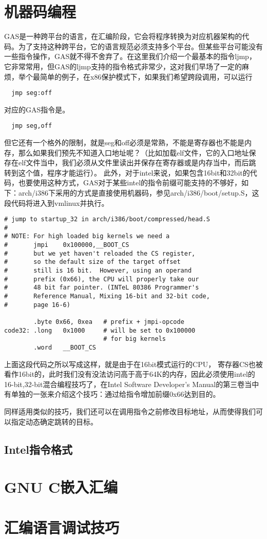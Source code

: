\section{机器码编程}
GAS是一种跨平台的语言，在汇编阶段，它会将程序转换为对应机器架构的代码。为了支持这种跨平台，它的语言规范必须支持多个平台。但某些平台可能没有一些指令操作，GAS就不得不舍弃了。在这里我们介绍一个最基本的指令ljmp，它非常常用，但GAS的ljmp支持的指令格式非常少，这对我们早场了一定的麻烦，举个最简单的例子，在x86保护模式下，如果我们希望跨段调用，可以运行
\begin{lstlisting}
  jmp seg:off
\end{lstlisting}
对应的GAS指令是。
\begin{lstlisting}
  jmp seg,off
\end{lstlisting}
但它还有一个格外的限制，就是seg和off必须是常熟，不能是寄存器也不能是内存，那么如果我们预先不知道入口地址呢？（比如加载elf文件，它的入口地址保存在elf文件当中，我们必须从文件里读出并保存在寄存器或是内存当中，而后跳转到这个值，程序才能运行）。
此外，对于intel来说，如果包含16bit和32bit的代码，也要使用这种方式，GAS对于某些intel的指令前缀可能支持的不够好，如下：arch/i386下采用的方式是直接使用机器码，参见arch/i386/boot/setup.S，这段代码将进入到vmlinux并执行。
\begin{lstlisting}
# jump to startup_32 in arch/i386/boot/compressed/head.S
#
# NOTE: For high loaded big kernels we need a
#       jmpi    0x100000,__BOOT_CS
#       but we yet haven't reloaded the CS register,
#       so the default size of the target offset
#       still is 16 bit.  However, using an operand 
#       prefix (0x66), the CPU will properly take our 
#       48 bit far pointer. (INTeL 80386 Programmer's 
#       Reference Manual, Mixing 16-bit and 32-bit code, 
#       page 16-6)

        .byte 0x66, 0xea   # prefix + jmpi-opcode
code32: .long   0x1000     # will be set to 0x100000
                           # for big kernels
        .word   __BOOT_CS

\end{lstlisting}
上面这段代码之所以写成这样，就是由于在16bit模式运行的CPU， 寄存器CS也被看作16bit的，此时我们没有没法访问高于高于64K的内存，因此必须使用intel的16-bit,32-bit混合编程技巧了，在Intel Software Developer's Manual的第三卷当中有单独的一张来介绍这个技巧：通过给指令增加前缀0x66达到目的。

同样适用类似的技巧，我们还可以在调用指令之前修改目标地址，从而使得我们可以指定动态确定跳转的目标。
\subsection{Intel指令格式}
\section{GNU C嵌入汇编}
\section{汇编语言调试技巧}
